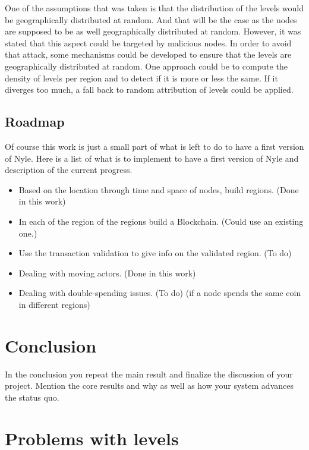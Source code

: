 \documentclass[a4paper,11pt,oneside]{report}
\begin{document}
One of the assumptions that was taken is that the distribution of the levels would be geographically distributed at random. And that will be the case as the nodes are  supposed to be as well geographically distributed at random. However, it was stated that this aspect could be targeted by malicious nodes. In order to avoid that attack, some mechanisms could be developed to ensure that the levels are geographically distributed at random. One approach could be to compute the density of levels per region and to detect if it is more or less the same. If it diverges too much, a fall back to random attribution of levels could be applied. 

\section{Roadmap}
Of course this work is just a small part of what is left to do to have a first
version of Nyle. Here is a list of what is to implement to have a first version
of Nyle and description of the current progress.

\begin{itemize} 
\item Based on the location through time and space of nodes, build regions.
(Done in this work)
\item In each of the region of the regions build a Blockchain. (Could use an
    existing one.)
\item Use the transaction validation to give info on the validated region. (To
do) 
\item Dealing with moving actors. (Done in this work)
\item Dealing with double-spending issues. (To do)
(if a node spends the same coin in different regions) 
\end{itemize}

\chapter{Conclusion} \label{chap:Conclusion}

In the conclusion you repeat the main result and finalize the discussion of
your project. Mention the core results and why as well as how your system
advances the status quo.

\cleardoublepage {} {}
\printbibliography


\appendix

\chapter{Problems with levels}
\end{document}
